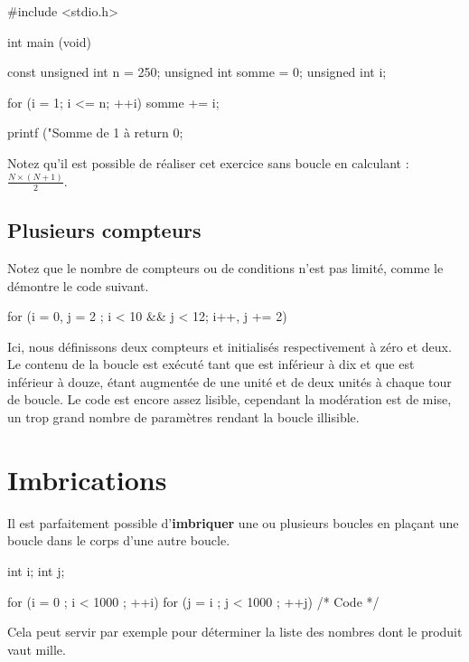 \begin{C}
 #include <stdio.h>


int main (void)
{
    const unsigned int n = 250;
    unsigned int somme = 0;
    unsigned int i;

    for (i = 1; i <= n; ++i)
        somme += i;

    printf ("Somme de 1 à %
    return 0;
}
\end{C}

\begin{infobox}
 Notez qu'il est possible de réaliser
cet exercice sans boucle en calculant : \(\frac {N \times (N+1)} {2}\).
\end{infobox}

\subsection{Plusieurs compteurs}
\label{plusieurs-compteurs}

Notez que le nombre de compteurs ou de conditions n'est pas limité,
comme le démontre le code suivant.

\begin{C}
for (i = 0, j = 2 ; i < 10 && j < 12; i++, j += 2)
\end{C}

Ici, nous définissons deux compteurs  et 
initialisés respectivement à zéro et deux. Le contenu de la boucle est
exécuté tant que  est inférieur à dix et que  est
inférieur à douze,  étant augmentée de une unité et 
de deux unités à chaque tour de boucle. Le code est encore assez
lisible, cependant la modération est de mise, un trop grand nombre de
paramètres rendant la boucle  illisible.

\section{Imbrications}
\label{imbrications}

Il est parfaitement possible d'\textbf{imbriquer} une ou plusieurs
boucles en plaçant une boucle dans le corps d'une autre boucle.

\begin{C}
int i;
int j;

for (i = 0 ; i < 1000 ; ++i)
{
    for (j = i ; j < 1000 ; ++j)
    {
          /*  Code  */
    }
}
\end{C}

Cela peut servir par exemple pour déterminer la liste des nombres dont
le produit vaut mille.

